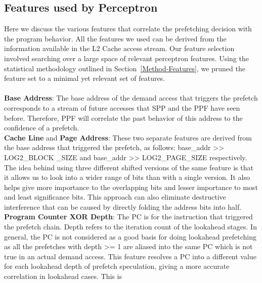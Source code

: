 \subsection{Features used by Perceptron}
\label{Impl-Features}
Here we discuss the various features that correlate the prefetching
decision with the program behavior. All the features we used can be 
derived from the information available in the L2 Cache access stream.
Our feature selection involved searching over a large space of 
relevant perceptron features. Using the statistical methodology 
outlined in Section~\ref{Method-Features}, we pruned the feature 
set to a minimal yet relevant set of features. \\ \\
%
%
\textbf{Base Address}: The base address of the demand access that triggers the
prefetch corresponds to a stream of future accesses that SPP and the PPF have
seen before. Therefore, PPF will correlate the past behavior of this address
to the confidence of a prefetch. \\
%
\textbf{Cache Line} and \textbf{Page Address}: These two separate features are
derived from the base address that triggered the prefetch, as follows:
base\_addr >> LOG2\_BLOCK \_SIZE and base\_addr >> LOG2\_PAGE\_SIZE
respectively. The idea behind using three different shifted versions of the
same feature is that it allows us to look into a wider range of bits than with
a single version. It also helps give more importance to the overlapping bits
and lesser importance to most and least significance bits. This approach can
also eliminate destructive interference that can be caused by directly folding
the address bits into half. \\
%
\textbf{Program Counter XOR Depth}: The PC is for the instruction that
triggered the prefetch chain. Depth refers to the iteration count of the
lookahead stages. In general, the PC is not considered as a good basis for
doing lookahead prefetching as all the prefetches with depth >= 1 are aliased
into the same PC which is not true in an actual demand access. This feature
resolves a PC into a different value for each lookahead depth of prefetch
speculation, giving a more accurate correlation in lookahead cases. This is

